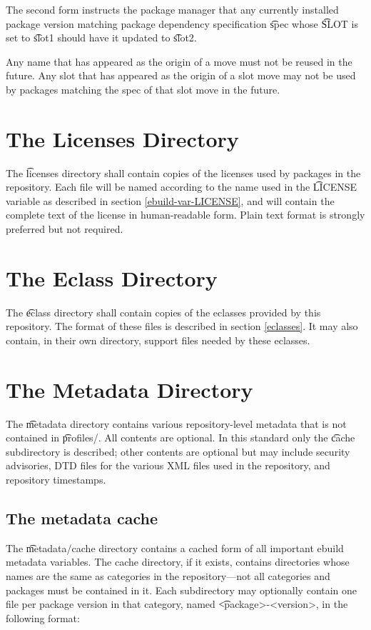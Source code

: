 The second form instructs the package manager that any currently installed package version matching
package dependency specification \t{spec} whose \t{SLOT} is set to \t{slot1} should have it updated
to \t{slot2}.

Any name that has appeared as the origin of a move must not be reused in the future. Any slot
that has appeared as the origin of a slot move may not be used by packages matching the spec of
that slot move in the future.

\section{The Licenses Directory}
\label{licenses-dir}

The \t{licenses} directory shall contain copies of the licenses used by packages in the
repository. Each file will be named according to the name used in the \t{LICENSE} variable as
described in section \ref{ebuild-var-LICENSE}, and will contain the complete text of the license in
human-readable form. Plain text format is strongly preferred but not required.

\section{The Eclass Directory}
\label{eclass-dir}

The \t{eclass} directory shall contain copies of the eclasses provided by this repository. The
format of these files is described in section \ref{eclasses}. It may also contain, in their own
directory, support files needed by these eclasses.

\section{The Metadata Directory}
\label{metadata-dir}

The \t{metadata} directory contains various repository-level metadata that is not contained in
\t{profiles/}. All contents are optional. In this standard only the \t{cache} subdirectory is
described; other contents are optional but may include security advisories, DTD files for the
various XML files used in the repository, and repository timestamps.

\subsection{The metadata cache}

The \t{metadata/cache} directory contains a cached form of all important ebuild metadata variables.
The cache directory, if it exists, contains directories whose names are the same as categories in
the repository---not all categories and packages must be contained in it. Each subdirectory may
optionally contain one file per package version in that category, named \t{<package>-<version>},
in the following format:

